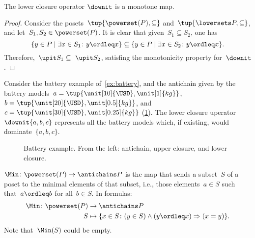 \begin{lemma}
    The lower closure operator $\downit$ is a monotone map.
\end{lemma}

\begin{proof}
    Consider the posets~$\tup{\powerset(P),\subseteq}$ and~$\tup{\lowersets P,\subseteq}$, and let~$S_1,S_2\in \powerset(P)$. It is clear that given~$S_1\subseteq S_2$, one has
    \begin{equation}
        \{y\in P\mid \exists x\in S_1\colon y\ordleq x\} \subseteq \{y\in P\mid \exists x\in S_2\colon y\ordleq x\}.
    \end{equation}
    Therefore,~$\upit S_1\subseteq \ \upit S_2$, satisfing the monotonicity property for~$\downit$.
\end{proof}



\begin{example}
    Consider the battery example of~\cref{ex:battery}, and the antichain given by the battery models~$a=\tup{\unit[10]{\USD},\unit[1]{kg}}$, $b=\tup{\unit[20]{\USD},\unit[0.5]{kg}}$, and~$c=\tup{\unit[30]{\USD},\unit[0.25]{kg}}$ (\cref{fig:examplebatt}).
    The lower closure uperator~$\downit\{a,b,c\}$ represents all the battery models which, if existing, would dominate~$\{a,b,c\}$.

\end{example}
\begin{figure}[h!]
    \begin{center}
    \end{center}
    \caption{Battery example. From the left: antichain, upper closure, and lower closure.
    \label{fig:examplebatt}}
\end{figure}


\begin{definition}[Min]
    \label{def:Min}
    $\Min \colon \powerset(P) \to \antichains P$ is the map that sends a subset~$S$ of a poset to the minimal elements of that subset, i.e., those elements~$a \in S$ such that~$a \ordleq b$ for all~$b \in S$. In formulas:
    \begin{equation*}
        \begin{aligned}
            \Min \colon \powerset(P) &\to \antichains P\\
            S&\mapsto \{ x\in S\colon (y\in S)\wedge(y\ordleq x)\Rightarrow (x=y)\}.
        \end{aligned}
    \end{equation*}
    Note that~$\Min(S)$ could be empty.
\end{definition}

